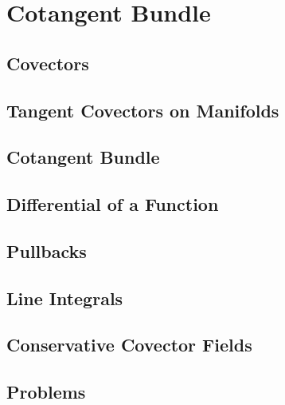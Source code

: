 \chapter{Cotangent Bundle}
\section{Covectors}
\section{Tangent Covectors on Manifolds}
\section{Cotangent Bundle}
\section{Differential of a Function}
\section{Pullbacks}
\section{Line Integrals}
\section{Conservative Covector Fields}
\section{Problems}